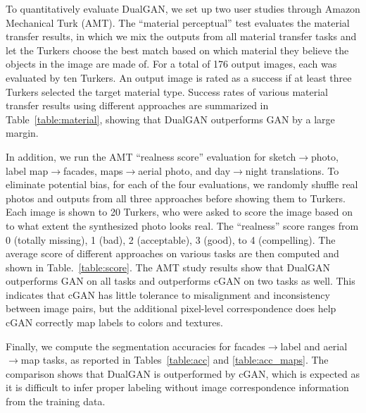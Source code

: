 To quantitatively evaluate DualGAN, we set up two user studies through Amazon Mechanical Turk (AMT). 
The ``material perceptual'' test evaluates the material transfer results, in which we mix the outputs 
from all material transfer tasks and let the Turkers choose the best match based on which material they 
believe the objects in the image are made of. For a total of 176 output images, each was evaluated by 
ten Turkers. An output image is rated as a success if at least three Turkers selected the target material type. 
Success rates of various material transfer results using different approaches are summarized in 
Table~\ref{table:material}, showing that DualGAN outperforms GAN by a large margin.

In addition, we run the AMT ``realness score'' evaluation for sketch$\rightarrow$photo, label map$\rightarrow$facades, 
maps$\rightarrow$aerial photo, and day$\rightarrow$night translations. To eliminate potential bias, for each of the four 
evaluations, we randomly shuffle real photos and outputs from all three approaches before showing them to Turkers.  
Each image is shown to 20 Turkers, who were asked to score the image based on to what extent the synthesized photo 
looks real. The ``realness'' score ranges from 0 (totally missing), 1 (bad), 2 (acceptable), 3 (good), to 4 (compelling). The 
average score of different approaches on various tasks are then computed and shown in Table.~\ref{table:score}. The 
AMT study results show that DualGAN outperforms GAN on all tasks and outperforms cGAN on two tasks as well. This 
indicates that cGAN has little tolerance to misalignment and inconsistency between image pairs, but the additional 
pixel-level correspondence does help cGAN correctly map labels to colors and textures.



Finally, we compute the segmentation accuracies for facades$\rightarrow$label and aerial$\rightarrow$map tasks, as reported
in Tables~\ref{table:acc} and \ref{table:acc_maps}. The comparison shows that DualGAN is outperformed by cGAN, which is 
expected as it is difficult to infer proper labeling without image correspondence information from the training data.

